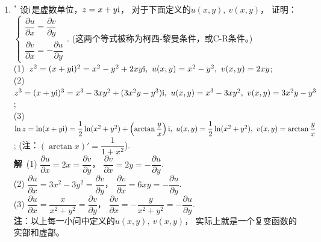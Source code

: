 \begin{enumerate}[label={【\textbf{例\thechapter.\arabic*}】},
 leftmargin=\inteval{\myenumleftmargin}pt,
 itemsep=\inteval{\myenumitempsep}pt,
 itemindent=\inteval{\myenumitemindent}pt]
\item $^*$ 设$ \mathrm{i} $是虚数单位，$ z=x+y\mathrm{i} $，
对于下面定义的$ u(x,y),\ v(x,y) $，
证明：$ \begin{cases}
    \dfrac{\partial u}{\partial x} =\dfrac{\partial v}{\partial y} \\
    \dfrac{\partial v}{\partial x} =-\dfrac{\partial u}{\partial y} 
\end{cases} $. (这两个等式被称为柯西-黎曼条件，或C-R条件。)\\
(1)\ $ z^2=(x+y\i)^2=x^2-y^2+2xy\i,\ u(x,y)=x^2-y^2,\ v(x,y)=2xy $; \\
(2)\ $ z^3=(x+y\i)^3=x^3-3xy^2+(3x^2y-y^3)\i,\ u(x,y)=x^3-3xy^2,\ 
v(x,y)=3x^2y-y^3 $; \\
(3)\ $ \ln z=\ln(x+y\mathrm{i})=\dfrac{1}{2}\ln(x^2+y^2)+\left(\arctan\dfrac{y}{x}\right)\mathrm{i},
\ u(x,y)=\dfrac{1}{2}\ln(x^2+y^2),\ v(x,y)=\arctan\dfrac{y}{x} $; 
(注：$ (\arctan x)'=\dfrac{1}{1+x^2} $). \\
\textbf{解}\ (1) $ \dfrac{\partial u}{\partial x} =2x=
\dfrac{\partial v}{\partial y} $，
$ \dfrac{\partial v}{\partial x} =2y=
-\dfrac{\partial u}{\partial y} $. \\
(2) $ \dfrac{\partial u}{\partial x} =3x^2-3y^2=
\dfrac{\partial v}{\partial y} $，
$ \dfrac{\partial v}{\partial x} =6xy=
-\dfrac{\partial u}{\partial y} $. \\
(3) $ \dfrac{\partial u}{\partial x} =\dfrac{x}{x^2+y^2}=
\dfrac{\partial v}{\partial y} $，
$ \dfrac{\partial v}{\partial x} = -\dfrac{y}{x^2+y^2}=
-\dfrac{\partial u}{\partial y} $. \\
\textbf{注}：以上每一小问中定义的$ u(x,y),\ v(x,y) $，
实际上就是一个复变函数的实部和虚部。


\end{enumerate}
